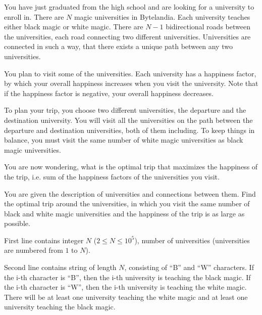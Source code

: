 





You have just graduated from the high school and are looking for a university to enroll in.
There are $N$ magic universities in Bytelandia. Each university teaches either
black magic or white magic. There are $N-1$ bidirectional roads between the universities, each road
connecting two different universities. Universities are connected in such a way,
that there exists a unique path between any two universities.

You plan to visit some of the universities.
Each university has a happiness factor, by which your overall happiness increases
when you visit the university. Note that if the happiness factor is negative, your overall
happiness decreases.

To plan your trip, you choose two different universities,
the departure and the destination university. You will visit all the universities
on the path between the departure and destination universities, both of them including.
To keep things in balance, you must visit the same number of white magic universities as black magic universities.

You are now wondering, what is the optimal trip that maximizes the happiness of the trip,
i.e. sum of the happiness factors of the universities you visit.


You are given the description of universities and connections between them.
Find the optimal trip around the universities, in which you visit
the same number of black and white magic universities and the happiness of the trip
is as large as possible.


First line contains integer $N$ ($2 \leq N \leq 10^5$), number of universities (universities are numbered from $1$ to $N$).

Second line contains string of length $N$, consisting of ``B'' and ``W'' characters.
If the i-th character is ``B'', then the i-th university is teaching the black magic.
If the i-th character is ``W'', then the i-th university is teaching the white magic.
There will be at least one university teaching the white magic and at least one university teaching the black magic.


